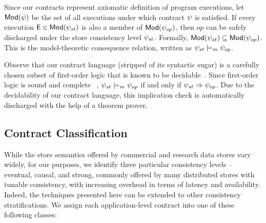 Since our contracts represent axiomatic definition of program executions, let
${\normalfont \textsf{Mod}}(\psi)$ be the set of all executions under which contract $\psi$ is
satisfied. If every execution ${\normalfont \textsf{E}} \in {\normalfont \textsf{Mod}}(\psi_{st})$ is also a member of
${\normalfont \textsf{Mod}}(\psi_{op})$, then $op$ can be safely discharged under the store
consistency level $\psi_{st}$. Formally, ${\normalfont \textsf{Mod}}(\psi_{st}) \subseteq
{\normalfont \textsf{Mod}}(\psi_{op})$. This is the model-theoretic consequence relation, written as
$\psi_{st} \models_m \psi_{op}$.

Observe that our contract language (stripped of its syntactic sugar) is a
carefully chosen subset of first-order logic that is known to be
decidable~\cite{epr}.  Since first-order logic is sound and complete
~\cite{completeness}, $\psi_{st} \models_m \psi_{op}$ if and only if $\psi_{st}
\Rightarrow \psi_{op}$.  Due to the decidability of our contract language, this
implication check is automatically discharged with the help of a theorem
prover.

\subsection{Contract Classification}

While the store semantics offered by commercial and research data stores
vary widely, for our purposes, we identify three particular consistency
levels -- eventual, causal, and strong, commonly offered by many distributed
stores with tunable consistency, with increasing overhead in terms of
latency and availability. Indeed, the techniques presented here can be
extended to other consistency stratifications. We assign each
application-level contract into one of these following classes:


